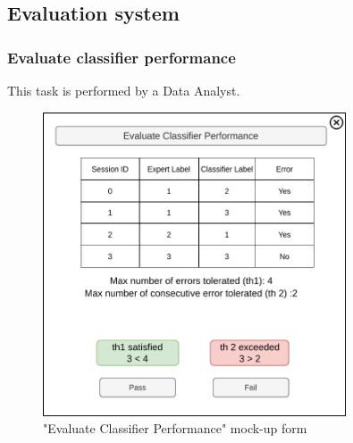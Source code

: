 \subsection{Evaluation system}

\subsubsection{Evaluate classifier performance}

This task is performed by a Data Analyst.

\begin{figure}[H]
\centering
\includegraphics[width=0.8\textwidth]{figures/evaluate_classifier_performance.pdf}
\caption{"Evaluate Classifier Performance" mock-up form}
\end{figure}

